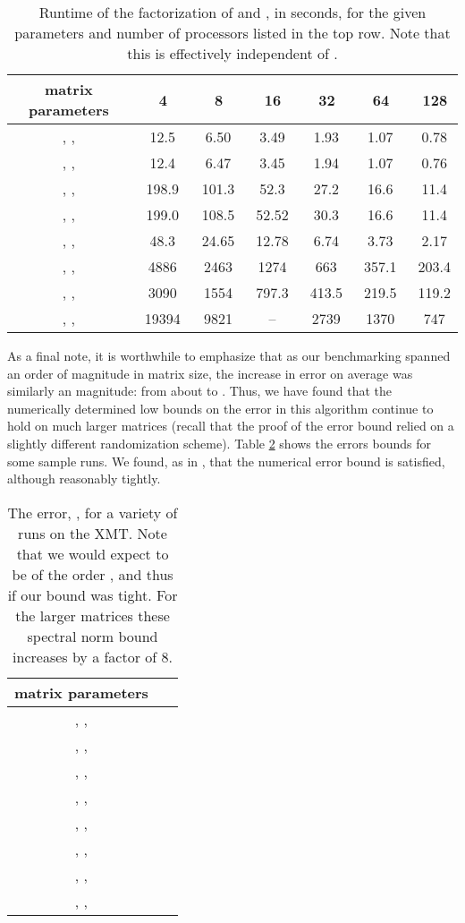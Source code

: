 \documentclass[11pt]{article}
\begin{document}
\begin{table}[here]
\centering
\begin{tabular}{|c|c|c|c|c|c|c|}\hline
matrix parameters &\ 4 &\ 8 &\ 16 &\ 32 &\ 64 &\ 128  \\ \hline
, ,  &\ 12.5 &\ 6.50 &\  3.49  &\  1.93 &\   1.07 &\  0.78 \\ 
, ,  &\  12.4 &\ 6.47  &\  3.45  &\ 1.94   &\  1.07   &\  0.76  \\ 
, ,  &\  198.9  &\ 101.3  &\   52.3 &\  27.2 &\  16.6  &\  11.4 \\ 
, ,  &\  199.0 &\  108.5 &\  52.52   &\ 30.3  &\   16.6 &\  11.4 \\ 
, ,  &\  48.3 &\  24.65 &\  12.78  &\   6.74 &\   3.73 &\  2.17 \\ 
, ,  &\  4886 &\ 2463 &\  1274  &\  663  &\  357.1  &\  203.4 \\ 
, ,  &\ 3090  &\ 1554  &\ 797.3  &\ 413.5  &\   219.5 &\  119.2 \\ 
, ,  &\  19394  &\ 9821  &\  --  &\ 2739   &\ 1370   &\  747   \\  \hline
\end{tabular}
\caption{Runtime of the factorization of  and , in seconds, for the given parameters and number of processors listed in the top row.  Note that this is effectively independent of .}
\label{bigt3}
\end{table}


As a final note, it is worthwhile to emphasize that as our benchmarking spanned an order of magnitude in matrix size, the increase in error on average was similarly an magnitude: from about  to .  Thus, we have found that the numerically determined low bounds on the error in this algorithm continue to hold on much larger matrices (recall that the proof of the error bound relied on a slightly different randomization scheme).  Table \ref{ertab} shows the errors bounds for some sample runs.  We found, as in \cite{rokpnas}, that the numerical error bound is satisfied, although reasonably tightly.  
\begin{table}[here]
\centering
\begin{tabular}{|c|c|}\hline
matrix parameters &\  \\ \hline
, ,  &\  \\
, ,  &\  \\
, ,  &\  \\
, ,  &\  \\
, ,  &\  \\
, ,  &\  \\
, ,  &\  \\
, ,  &\  \\ \hline
\end{tabular}
\caption{The error, , for a variety of runs on the XMT.  Note that we would expect  to be of the order , and thus  if our bound was tight.  For the larger matrices these spectral norm bound increases by a  factor of 8.}
\label{ertab}
\end{table}
\end{document}
